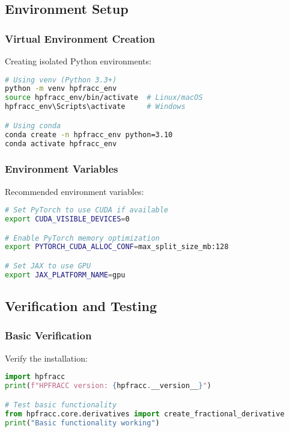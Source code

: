 \subsection{Environment Setup}

\subsubsection{Virtual Environment Creation}

Creating isolated Python environments:

\begin{lstlisting}[language=bash, caption=Virtual Environment Setup]
# Using venv (Python 3.3+)
python -m venv hpfracc_env
source hpfracc_env/bin/activate  # Linux/macOS
hpfracc_env\Scripts\activate     # Windows

# Using conda
conda create -n hpfracc_env python=3.10
conda activate hpfracc_env
\end{lstlisting}

\subsubsection{Environment Variables}

Recommended environment variables:

\begin{lstlisting}[language=bash, caption=Environment Variables]
# Set PyTorch to use CUDA if available
export CUDA_VISIBLE_DEVICES=0

# Enable PyTorch memory optimization
export PYTORCH_CUDA_ALLOC_CONF=max_split_size_mb:128

# Set JAX to use GPU
export JAX_PLATFORM_NAME=gpu
\end{lstlisting}

\subsection{Verification and Testing}

\subsubsection{Basic Verification}

Verify the installation:

\begin{lstlisting}[language=python, caption=Installation Verification]
import hpfracc
print(f"HPFRACC version: {hpfracc.__version__}")

# Test basic functionality
from hpfracc.core.derivatives import create_fractional_derivative
print("Basic functionality working")
\end{lstlisting}

